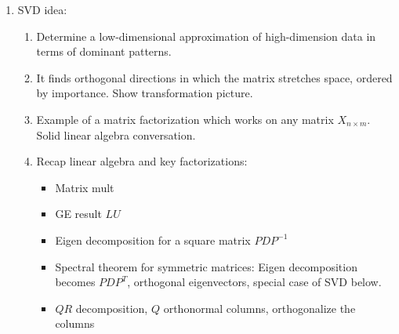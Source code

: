 \documentclass{article}
\begin{document}
\begin{enumerate}
\item SVD idea: 
\begin{enumerate}
\item Determine a low-dimensional approximation of high-dimension data in terms of dominant patterns. 
\item It finds orthogonal directions in which the matrix stretches space, ordered by importance. Show transformation picture.
\item Example of a matrix factorization which works on any matrix $X_{n \times m}$. Solid linear algebra conversation.
\item Recap linear algebra and key factorizations: 
\begin{itemize}
\item Matrix mult 
\item GE result $LU$ 
\item Eigen decomposition for a square matrix $P D P^{-1}$
\item Spectral theorem for symmetric matrices: Eigen decomposition becomes $P D P^T$, orthogonal eigenvectors, special case of SVD below. 
\item $QR$ decomposition, $Q$ orthonormal columns, orthogonalize the columns 
\end{itemize}
\end{enumerate}


\end{enumerate}
\end{document}
